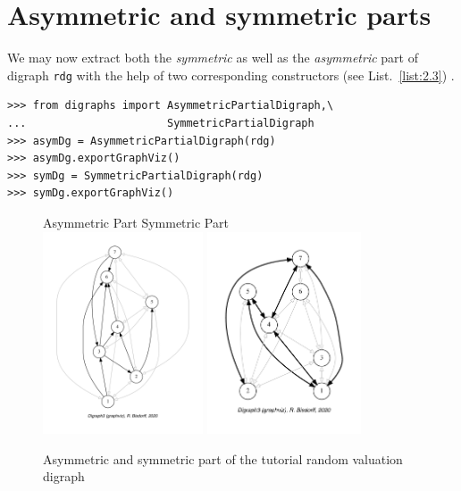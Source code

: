 \section{Asymmetric and symmetric parts}
\label{sec:2.3}

We may now extract both the \emph{}\emph{symmetric} as well as the \emph{asymmetric} part of digraph \texttt{rdg} with the help of two corresponding constructors (see List.~\vref{list:2.3}) .
\begin{lstlisting}[caption={Computing asymmetric and symmetric Parts},label=list:2.3]
>>> from digraphs import AsymmetricPartialDigraph,\
...                      SymmetricPartialDigraph
>>> asymDg = AsymmetricPartialDigraph(rdg)
>>> asymDg.exportGraphViz()
>>> symDg = SymmetricPartialDigraph(rdg)
>>> symDg.exportGraphViz()
\end{lstlisting}
\begin{figure}[ht]
  Asymmetric Part \hfill Symmetric Part \\
  \includegraphics[height=6cm]{Figures/2-2-asymmetricPart.pdf}\hfill
  \includegraphics[height=6cm]{Figures/2-2-symmetricPart.pdf}\hfill
\caption{Asymmetric and symmetric part of the tutorial random valuation digraph}
\label{fig:2.2}       %
\end{figure}


